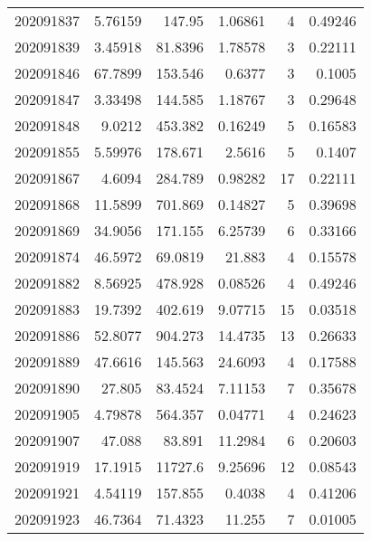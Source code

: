 \begin{tabular}{rrrrrr}
 202091837 &          5.76159 &      147.95   &            1.06861 &           4 & 0.49246 \\
 202091839 &          3.45918 &       81.8396 &            1.78578 &           3 & 0.22111 \\
 202091846 &         67.7899  &      153.546  &            0.6377  &           3 & 0.1005  \\
 202091847 &          3.33498 &      144.585  &            1.18767 &           3 & 0.29648 \\
 202091848 &          9.0212  &      453.382  &            0.16249 &           5 & 0.16583 \\
 202091855 &          5.59976 &      178.671  &            2.5616  &           5 & 0.1407  \\
 202091867 &          4.6094  &      284.789  &            0.98282 &          17 & 0.22111 \\
 202091868 &         11.5899  &      701.869  &            0.14827 &           5 & 0.39698 \\
 202091869 &         34.9056  &      171.155  &            6.25739 &           6 & 0.33166 \\
 202091874 &         46.5972  &       69.0819 &           21.883   &           4 & 0.15578 \\
 202091882 &          8.56925 &      478.928  &            0.08526 &           4 & 0.49246 \\
 202091883 &         19.7392  &      402.619  &            9.07715 &          15 & 0.03518 \\
 202091886 &         52.8077  &      904.273  &           14.4735  &          13 & 0.26633 \\
 202091889 &         47.6616  &      145.563  &           24.6093  &           4 & 0.17588 \\
 202091890 &         27.805   &       83.4524 &            7.11153 &           7 & 0.35678 \\
 202091905 &          4.79878 &      564.357  &            0.04771 &           4 & 0.24623 \\
 202091907 &         47.088   &       83.891  &           11.2984  &           6 & 0.20603 \\
 202091919 &         17.1915  &    11727.6    &            9.25696 &          12 & 0.08543 \\
 202091921 &          4.54119 &      157.855  &            0.4038  &           4 & 0.41206 \\
 202091923 &         46.7364  &       71.4323 &           11.255   &           7 & 0.01005 \\

\end{tabular}
